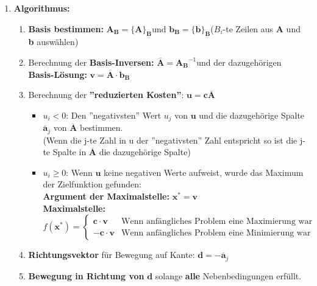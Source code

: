 \begin{enumerate}
\item \textbf{Algorithmus:}
	\begin{enumerate}
	\item \textbf{Basis bestimmen: } $\boxed{\mathbf{A_B}=\{\mathbf{A}\}_{\mathbf{B}}}$\quad und \quad $\boxed{\mathbf{b}_\mathbf{B}=\{\mathbf{b}\}_{\mathbf{B}}}$\quad ($B_i$-te Zeilen aus \textbf{A} und \textbf{b} auswählen)\\
	\item Berechnung der \textbf{Basis-Inversen: }$\boxed{\overline{\mathbf{A}}=\mathbf{A_B}^{-1}}$\quad und der dazugehörigen \textbf{Basis-Lösung: }$\boxed{\mathbf{v}=\mathbf{\overline{A}}\cdot\mathbf{b_B}}$\\
	\item Berechnung der \textbf{''reduzierten Kosten''}: $\boxed{\mathbf{u}=\mathbf{c\overline{A}}}$
	\begin{itemize}
		\item $u_i<0$: Den ''negativsten'' Wert $u_j$ von $\mathbf{u}$ und die dazugehörige Spalte $\mathbf{\overline{a}}_j$ von $\mathbf{\overline{A}}$ bestimmen.\\
		(Wenn die j-te Zahl in u der ''negativsten'' Zahl entspricht so ist die j-te Spalte in $\mathbf{\overline{A}}$ die dazugehörige Spalte)
		\item $u_i\geq 0$: Wenn $\mathbf{u}$ keine negativen Werte aufweist, wurde das Maximum der Zielfunktion gefunden:\\
		\textbf{Argument der Maximalstelle:} $\boxed{\mathbf{x^*}=\mathbf{v}}$\\
		\textbf{Maximalstelle:} 
		$\boxed{f(\mathbf{x^*})=\left\{
		  \begin{array}{ll}
		    \mathbf{c}\cdot\mathbf{v} & \text{Wenn anfängliches Problem eine Maximierung war}\\
		    -\mathbf{c}\cdot\mathbf{v}& \text{Wenn anfängliches Problem eine Minimierung war}
		  \end{array}
		\right.}$
	\end{itemize}
	\item \textbf{Richtungsvektor} für Bewegung auf Kante: $\boxed{\mathbf{d}=-\mathbf{\overline{a}}_j}$
	\item \textbf{Bewegung in Richtung von} $\mathbf{d}$ solange \textbf{alle} Nebenbedingungen erfüllt.\\
	

\end{enumerate}
\end{enumerate}
